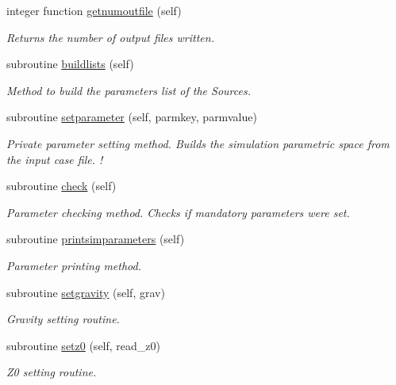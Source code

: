 \begin{DoxyCompactItemize}
integer function \mbox{\hyperlink{namespacesimulation__globals__mod_a8114d54a4c7e4cf505b30d51f4bdccdd}{getnumoutfile}} (self)
\begin{DoxyCompactList}\small\item\em Returns the number of output files written. \end{DoxyCompactList}\item 
subroutine \mbox{\hyperlink{namespacesimulation__globals__mod_a7d1e2edffaed498051342e0cd902ce1c}{buildlists}} (self)
\begin{DoxyCompactList}\small\item\em Method to build the parameters list of the Sources. \end{DoxyCompactList}\item 
subroutine \mbox{\hyperlink{namespacesimulation__globals__mod_a8a05831d4c3e3eb5741d65978f6fcf61}{setparameter}} (self, parmkey, parmvalue)
\begin{DoxyCompactList}\small\item\em Private parameter setting method. Builds the simulation parametric space from the input case file. ! \end{DoxyCompactList}\item 
subroutine \mbox{\hyperlink{namespacesimulation__globals__mod_a41249abb5c33ef9e8bff448f0b3826fa}{check}} (self)
\begin{DoxyCompactList}\small\item\em Parameter checking method. Checks if mandatory parameters were set. \end{DoxyCompactList}\item 
subroutine \mbox{\hyperlink{namespacesimulation__globals__mod_a97c04d0289a9f2d004a9329cb7ab16f0}{printsimparameters}} (self)
\begin{DoxyCompactList}\small\item\em Parameter printing method. \end{DoxyCompactList}\item 
subroutine \mbox{\hyperlink{namespacesimulation__globals__mod_a9e92dfed4ef7388208adce768f064554}{setgravity}} (self, grav)
\begin{DoxyCompactList}\small\item\em Gravity setting routine. \end{DoxyCompactList}\item 
subroutine \mbox{\hyperlink{namespacesimulation__globals__mod_a64b1d91147c1cd5898fec8f23d56a65d}{setz0}} (self, read\+\_\+z0)
\begin{DoxyCompactList}\small\item\em Z0 setting routine. \end{DoxyCompactList}\item 

\end{DoxyCompactItemize}
